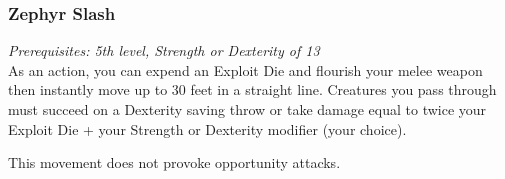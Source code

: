 \documentclass[letterpaper,justified,openany,oneside,twocolumn]{dndbook}
\begin{document}
\subsubsection*{Zephyr Slash}
\textit{Prerequisites: 5th level, Strength or Dexterity of 13}\\
As an action, you can expend an Exploit Die and flourish your melee weapon then instantly move up to 30 feet in a straight line. Creatures you pass through must succeed on a Dexterity saving throw or take damage equal to twice your Exploit Die + your Strength or Dexterity modifier (your choice).

This movement does not provoke opportunity attacks.
\end{document}
